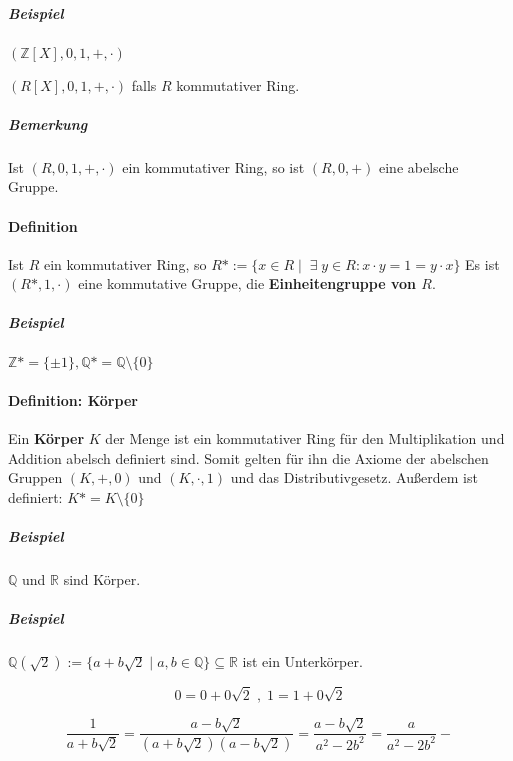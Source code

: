\documentclass[14pt,a4paper]{article}
\newcommand{\Z}{\ensuremath{\mathbb{Z}}}
\newcommand{\Q}{\ensuremath{\mathbb{Q}}}
\begin{document}
  \subparagraph{Beispiel}
  $ ( \Z[X], 0, 1, +, \cdot )$

  $ (R[X], 0, 1, +, \cdot) $ falls $R$ kommutativer Ring.

  \subparagraph{Bemerkung}
  Ist $(R, 0, 1, +, \cdot)$ ein kommutativer Ring, so ist $(R, 0, +)$ eine
  abelsche Gruppe.

  \paragraph{Definition}
  Ist $R$ ein kommutativer Ring, so $ R* := \{ x \in R \;| \;\;\exists\; y \in R :
  x \cdot y = 1 = y \cdot x \} $
  Es ist $(R*, 1, \cdot)$ eine kommutative Gruppe, die \textbf{Einheitengruppe
    von $R$}.
  \subparagraph{Beispiel}
  $ \Z* = \{ \pm 1\}, \Q* = \Q \setminus \{ 0 \} $


  \paragraph{Definition: Körper}
  Ein \textbf{Körper} $K$ der Menge ist ein kommutativer Ring für den Multiplikation
  und Addition abelsch definiert sind.
  Somit gelten für ihn die Axiome der abelschen Gruppen $(K,+,0)$ und $(K,
  \cdot, 1)$ und das Distributivgesetz.
  Außerdem ist definiert: $K* = K \setminus \{ 0 \}$

  \subparagraph{Beispiel} $\Q$ und $\mathbb{R}$ sind Körper.

  \subparagraph{Beispiel}
  $ \Q( \sqrt{2} ) := \{ a + b \sqrt{2} \;|\; a,b \in \Q \} \subseteq
  \mathbb{R}$ ist ein Unterkörper.

  $$ 0 = 0 + 0 \sqrt{2} \;,\; 1 = 1 + 0 \sqrt{2} $$

  $$ \frac{1}{a+b\sqrt{2}} = \frac{a-b\sqrt{2}}{(a + b\sqrt{2})(a - b
    \sqrt{2})} = \frac{a - b\sqrt{2}}{a^2 - 2b^2} = \frac{a}{a^2 -
    2b^2} -  $$
\end{document}
